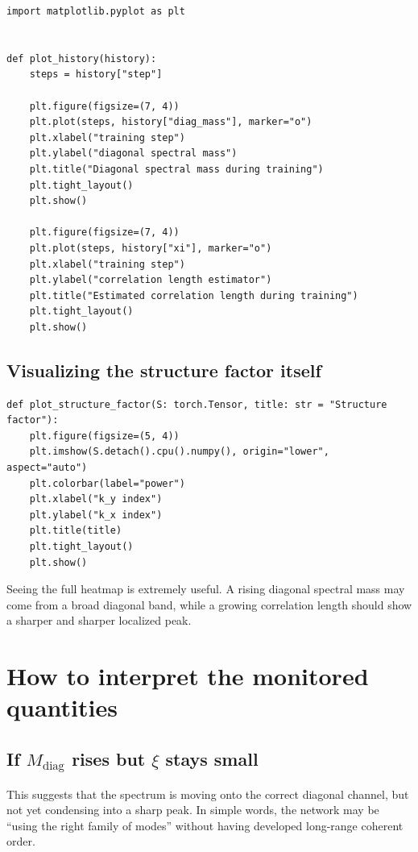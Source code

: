 \documentclass[11pt]{article}
\newcommand{\diag}{\mathrm{diag}}
\begin{document}
\begin{lstlisting}[style=pythonstyle]
import matplotlib.pyplot as plt


def plot_history(history):
    steps = history["step"]

    plt.figure(figsize=(7, 4))
    plt.plot(steps, history["diag_mass"], marker="o")
    plt.xlabel("training step")
    plt.ylabel("diagonal spectral mass")
    plt.title("Diagonal spectral mass during training")
    plt.tight_layout()
    plt.show()

    plt.figure(figsize=(7, 4))
    plt.plot(steps, history["xi"], marker="o")
    plt.xlabel("training step")
    plt.ylabel("correlation length estimator")
    plt.title("Estimated correlation length during training")
    plt.tight_layout()
    plt.show()
\end{lstlisting}

\subsection{Visualizing the structure factor itself}

\begin{lstlisting}[style=pythonstyle]
def plot_structure_factor(S: torch.Tensor, title: str = "Structure factor"):
    plt.figure(figsize=(5, 4))
    plt.imshow(S.detach().cpu().numpy(), origin="lower", aspect="auto")
    plt.colorbar(label="power")
    plt.xlabel("k_y index")
    plt.ylabel("k_x index")
    plt.title(title)
    plt.tight_layout()
    plt.show()
\end{lstlisting}

Seeing the full heatmap is extremely useful. A rising diagonal spectral mass may come from a broad diagonal band, while a growing correlation length should show a sharper and sharper localized peak.

\section{How to interpret the monitored quantities}

\subsection{If $M_{\diag}$ rises but $\xi$ stays small}

This suggests that the spectrum is moving onto the correct diagonal channel, but not yet condensing into a sharp peak. In simple words, the network may be ``using the right family of modes'' without having developed long-range coherent order.
\end{document}
